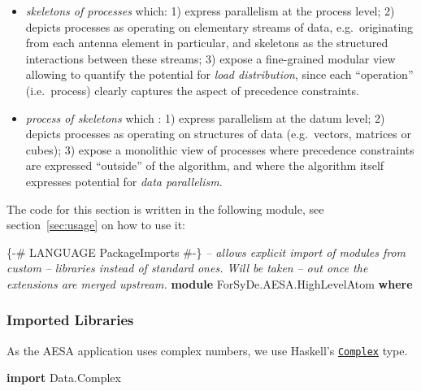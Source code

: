 \documentclass[
  a4paper,
]{article}
\newenvironment{Shaded}{}{}
\newcommand{\CommentTok}[1]{\textcolor[rgb]{0.38,0.63,0.69}{\textit{#1}}}
\newcommand{\DataTypeTok}[1]{\textcolor[rgb]{0.56,0.13,0.00}{#1}}
\newcommand{\KeywordTok}[1]{\textcolor[rgb]{0.00,0.44,0.13}{\textbf{#1}}}
\newcommand{\OtherTok}[1]{\textcolor[rgb]{0.00,0.44,0.13}{#1}}
\begin{document}
\begin{itemize}
\item
  \emph{skeletons of processes} which: 1) express parallelism at the
  process level; 2) depicts processes as operating on elementary streams
  of data, e.g.~originating from each antenna element in particular, and
  skeletons as the structured interactions between these streams; 3)
  expose a fine-grained modular view allowing to quantify the potential
  for \emph{load distribution}, since each ``operation'' (i.e.~process)
  clearly captures the aspect of precedence constraints.
\item
  \emph{process of skeletons} which : 1) express parallelism at the
  datum level; 2) depicts processes as operating on structures of data
  (e.g.~vectors, matrices or cubes); 3) expose a monolithic view of
  processes where precedence constraints are expressed ``outside'' of
  the algorithm, and where the algorithm itself expresses potential for
  \emph{data parallelism}.
\end{itemize}

The code for this section is written in the following module, see
section~\ref{sec:usage} on how to use it:

\begin{Shaded}
\begin{Highlighting}[numbers=left,,firstnumber=33,]
\OtherTok{\{-# LANGUAGE PackageImports #-\}} \CommentTok{-- allows explicit import of modules from custom}
                                \CommentTok{-- libraries instead of standard ones. Will be taken}
                                \CommentTok{-- out once the extensions are merged upstream.}
\KeywordTok{module} \DataTypeTok{ForSyDe.AESA.HighLevelAtom} \KeywordTok{where}
\end{Highlighting}
\end{Shaded}

\hypertarget{imported-libraries}{%
\subsubsection{Imported Libraries}\label{imported-libraries}}

As the AESA application uses complex numbers, we use Haskell's
\href{http://hackage.haskell.org/package/base/docs/Data-Complex.html}{\texttt{Complex}}
type.

\begin{Shaded}
\begin{Highlighting}[numbers=left,,firstnumber=43,]
\KeywordTok{import} \DataTypeTok{Data.Complex}
\end{Highlighting}
\end{Shaded}
\end{document}
